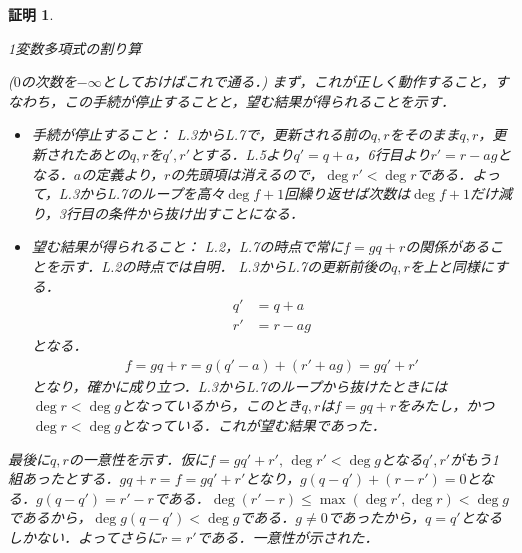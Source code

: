 \documentclass[9pt]{ltjsarticle}
\theoremstyle{break}
\theoremstyle{break}
\theoremstyle{break}
\theoremstyle{break}
\theoremstyle{break}
\theoremstyle{break}
\theoremstyle{break}
\theoremstyle{break}
\theoremstyle{break}
\theoremstyle{break}
\theoremstyle{break}
\theoremstyle{break}
\theoremstyle{break}
\theoremstyle{break}
\theoremstyle{break}
\theoremstyle{nonumberbreak}
\newtheorem{myproof}{証明}
\theoremstyle{nonumberbreak}
\begin{document}
 \begin{myproof}
\begin{algorithm}[H]
\caption{1変数多項式の割り算}
 \begin{algorithmic}[1]
  \ENDWHILE
 \end{algorithmic}
\end{algorithm}
($0$の次数を$-\infty$としておけばこれで通る．)
まず，これが正しく動作すること，すなわち，この手続が停止することと，望む結果が得られることを示す．
\begin{itemize}
 \item 手続が停止すること：
L.3からL.7で，更新される前の$q,r$をそのまま$q,r$，更新されたあとの$q,r$を$q',r'$とする．L.5より$q'=q+a$，6行目より$r'=r-ag$となる．$a$の定義より，$r$の先頭項は消えるので，$\deg r' < \deg r$である．よって，L.3からL.7のループを高々$\deg f + 1$回繰り返せば次数は$\deg f + 1$だけ減り，3行目の条件から抜け出すことになる．
 \item 望む結果が得られること：
L.2，L.7の時点で常に$f=gq+r$の関係があることを示す．L.2の時点では自明．
L.3からL.7の更新前後の$q,r$を上と同様にする．
\begin{align}
 q' &= q+a\\
 r'& = r-ag
\end{align}
となる．
\begin{align}
 f = gq+r = g(q'-a) + (r'+ag) = gq' + r'
\end{align}
となり，確かに成り立つ．L.3からL.7のループから抜けたときには$\deg r < \deg g$となっているから，このとき$q,r$は$f=gq+r$をみたし，かつ$\deg r < \deg g$となっている．これが望む結果であった．
\end{itemize}
最後に$q,r$の一意性を示す．仮に$f=gq' + r',\, \deg r' < \deg g$となる$q',r'$がもう1組あったとする．$gq + r = f = gq' + r'$となり，$g(q-q') + (r-r') = 0$となる．$g(q-q') = r'-r$である．$\deg(r'-r) \le \max(\deg r', \deg r) < \deg g$であるから，$\deg g(q-q') < \deg g$である．$g\neq 0$であったから，$q = q'$となるしかない．よってさらに$r=r'$である．一意性が示された．
 \end{myproof}
\end{document}
